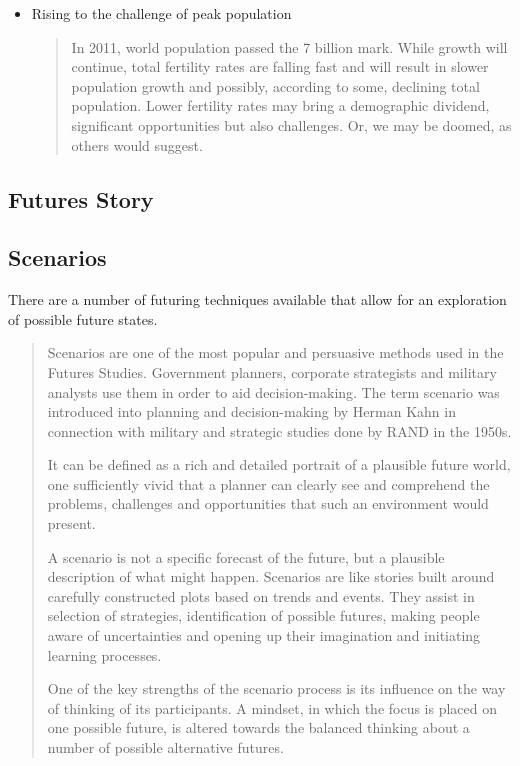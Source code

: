 \begin{itemize}
	\item Rising to the challenge of peak population
	\begin{quotation}
		In 2011, world population passed the 7 billion mark. While growth will continue, total fertility rates are falling fast and will result in slower population growth and possibly, according to some, declining total population. Lower fertility rates may bring a demographic dividend, significant opportunities but also challenges. Or, we may be doomed, as others would suggest.\end{quotation}
\end{itemize}


\subsection{Futures Story}

\subsection{Scenarios}
There are a number of futuring techniques available that allow for an exploration of possible future states.

\begin{quotation}
	Scenarios are one of the most popular and persuasive methods used in the Futures Studies. Government planners, corporate strategists and military analysts use them in order to aid decision-making. The term scenario was introduced into planning and decision-making by Herman Kahn in connection with military and strategic studies done by RAND in the 1950s.
	
	It can be defined as a rich and detailed portrait of a plausible future world, one sufficiently vivid that a planner can clearly see and comprehend the problems, challenges and opportunities that such an environment would present.
	
	A scenario is not a specific forecast of the future, but a plausible description of what might happen. Scenarios are like stories built around carefully constructed plots based on trends and events. They assist in selection of strategies, identification of possible futures, making people aware of uncertainties and opening up their imagination and initiating learning processes.
	
	One of the key strengths of the scenario process is its influence on the way of thinking of its participants. A mindset, in which the focus is placed on one possible future, is altered towards the balanced thinking about a number of possible alternative futures.\cite{WikipediaSP}
\end{quotation}

